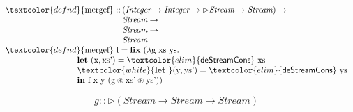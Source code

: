 \documentclass[xetex,serif,mathserif]{beamer}
\newenvironment{slide}[1]{\begin{frame}\frametitle{#1}}{\end{frame}}
\newcommand{\titlecard}[1]{\begin{frame}\begin{center}\usebeamercolor[fg]{frametitle}\usebeamerfont{frametitle}#1\end{center}\end{frame}}
\newcommand{\elim}[1]{\textcolor{elim}{\textsf{#1}}}
\newcommand{\kw}[1]{\textbf{#1}}
\newcommand{\tyname}[1]{\textit{#1}}
\newcommand{\ident}[1]{\textrm{#1}}
\newcommand{\defn}[1]{\textcolor{defnd}{\textrm{#1}}}
\begin{document}
\begin{slide}{}
  \begin{displaymath}
    \begin{array}{l}
      \begin{array}{@{}l@{\hspace{0.2em}}l}
        \defn{mergef} :: &
        (\tyname{Integer} \to \tyname{Integer} \to \rhd\tyname{Stream} \to \tyname{Stream}) \to \\
        &\tyname{Stream} \to \\
        &\tyname{Stream} \to \\
        &\tyname{Stream}
      \end{array} \\
      \defn{mergef}\ \ident{f} = \kw{fix}\ (\lambda \ident{g}\ \ident{xs}\ \ident{ys}. \\
      \hspace{3cm} \kw{let}\ (\ident{x}, \ident{xs’}) = \elim{deStreamCons}\ \ident{xs} \\
      \hspace{3cm} \textcolor{white}{\kw{let}\ }(\ident{y}, \ident{ys’}) = \elim{deStreamCons}\ \ident{ys} \\
      \hspace{3cm} \kw{in}\ \ident{f}\ \ident{x}\ \ident{y}\ (\ident{g} \circledast \ident{xs’} \circledast \ident{ys’}))
    \end{array}
  \end{displaymath}

  \begin{displaymath}
    g :: \rhd(\tyname{Stream} \to \tyname{Stream} \to \tyname{Stream})
  \end{displaymath}
\end{slide}

\frame{}

\end{document}
